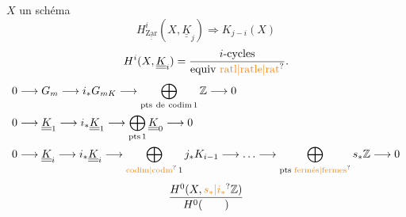 $X$ un schéma
\[
H_{\underline{\underline{\mathrm{Zar}}}}^{i}(X,\underline{\underline K}_j)\Longrightarrow K_{j-i}(X)
\]
\[
H^{i}(X,\underline{\underline K}_i)=\frac{i\text{-cycles}}{\text{equiv \unsure{ratl|ratle|rat}}}.
\]
{\small
\[
\begin{aligned}
0&\longrightarrow G_m\longrightarrow i_*G_{mK}\longrightarrow
\bigoplus_{\mathrm{pts\ de\ codim}\,1}\mathbb Z\longrightarrow0\\
0&\longrightarrow\underline{\underline K}_1\longrightarrow i_*\underline{\underline K}_1
\longrightarrow\bigoplus_{\mathrm{pts}\,1}\underline{\underline K}_0\longrightarrow0\\
0&\longrightarrow\underline{\underline K}_i\longrightarrow i_*\underline{\underline K}_i
\longrightarrow\bigoplus_{\text{\unsure{codim|codm}}\,1}j_*K_{i-1}\longrightarrow\ldots
\longrightarrow\bigoplus_{\text{pts \unsure{fermés|fermes}}}s_*\mathbb Z\longrightarrow0
\end{aligned}
\]
}
\[
\frac{H^0(X,\unsure{s_*|i_*}\mathbb Z)}{H^0(\qquad)}
\]

